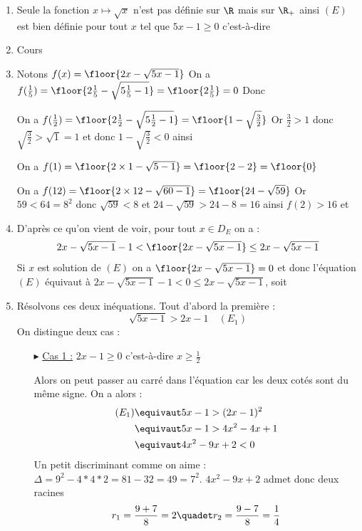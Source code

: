 \begin{correction}
\begin{enumerate}
\item Seule la fonction $x\mapsto \sqrt{x}$ n'est pas définie sur $\R$ mais sur $\R_+$ ainsi $(E)$ est bien définie pour tout $x$ tel que $5x-1\geq 0$ c'est-à-dire 
\conclusion{ $D_E=]\frac{1}{5},+\infty[$}
\item Cours 

\item Notons $f(x) = \floor{2x-\sqrt{5x-1} }$ 
On a $f(\frac{1}{5}) = \floor{2\frac{1}{5}-\sqrt{5\frac{1}{5}-1} }= \floor{2\frac{1}{5}} =0$
Donc 

On a $f(\frac{1}{2} )  =\floor{2\frac{1}{2}-\sqrt{5\frac{1}{2}-1} } = \floor{1-\sqrt{\frac{3}{2} }}$ Or $\frac{3}{2}> 1 $ donc 
$\sqrt{\frac{3}{2}} >\sqrt{1}=1$ et donc 
$1-\sqrt{\frac{3}{2} }<0$ ainsi  

On a $f(1) = \floor{2\times 1-\sqrt{5-1}} =\floor{2-2}=\floor{0}$

On  a $f(12) = \floor{2\times 12-\sqrt{60-1}}=\floor{24-\sqrt{59}}$ 
Or$ 59<64=8^2$ donc  $\sqrt{59} < 8 $ et 
$24-\sqrt{59}> 24-8=16$ ainsi $f(2)>16 $ et 


\item D'après ce qu'on vient de voir, pour tout $x\in D_E$ on a :
$$2x-\sqrt{5x-1} -1<\floor{2x-\sqrt{5x-1} } \leq 2x-\sqrt{5x-1} $$
Si $x$ est solution de $(E)$ on a $\floor{2x-\sqrt{5x-1} }=0$ et donc l'équation $(E)$ équivaut à $2x-\sqrt{5x-1} -1<0 \leq 2x-\sqrt{5x-1} $, soit 

\item Résolvons ces deux inéquations. Tout d'abord la première :
$$\sqrt{5x-1} >2x-1 \quad(E_1)$$
On distingue deux cas : 
\begin{itemize}
\item[$\blacktriangleright$] \underline{Cas 1 :} $2x-1\geq 0$ c'est-à-dire $x\geq \frac{1}{2}$

Alors on peut passer au carré dans l'équation car les deux cotés sont du même signe. On a alors : 
\begin{align*}
(E_1)& \equivaut 5x-1 > (2x-1) ^2\\
& \equivaut 5x-1 > 4x^2-4x+1\\
& \equivaut 4x^2-9x+2<0
\end{align*}
Un petit discriminant comme on aime : 
$\Delta = 9^2 - 4*4*2 = 81- 32= 49 =7^2$. 
$4x^2-9x+2$ admet donc deux racines 
$$r_1 = \frac{9+7}{8}=2 \quadet r_2 =\frac{9-7}{8} = \frac{1}{4}$$


\end{itemize}
\end{enumerate}
\end{correction}
